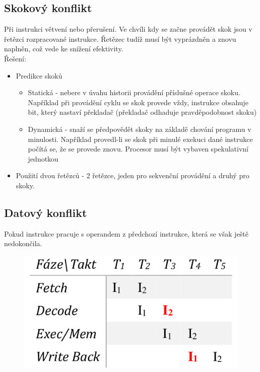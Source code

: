 \subsection{Skokový konflikt}
Při instrukci větvení nebo přerušení. Ve chvíli kdy se začne provádět skok jsou v řetězci rozpracované instrukce. Řetězec tudíž musí být vyprázdněn a znovu naplněn, což vede ke snížení efektivity.\\
Řešení:
\begin{itemize}
    \item Predikce skoků
          \begin{itemize}
              \item Statická - nebere v úvahu historii provádění příslušné operace skoku. Například při provádění cyklu se skok provede vždy, instrukce obsahuje bit, který nastaví překladač (překladač odhaduje pravděpodobnost skoku)
              \item Dynamická - snaží se předpovědět skoky na základě chování programu v minulosti. Například provedl-li se skok při minulé exekuci dané instrukce počítá se, že se provede znovu. Procesor musí být vybaven spekulativní jednotkou
          \end{itemize}
    \item Použití dvou řetězců - 2 řetězce, jeden pro sekvenční provádění a druhý pro skoky.
\end{itemize}

\subsection{Datový konflikt}
Pokud instrukce pracuje s operandem z předchozí instrukce, která se však ještě nedokončila. \\

\begin{figure}[h!]
    \centering
    \includegraphics[scale = 0.4]{img/datKonf.png}
\end{figure}

